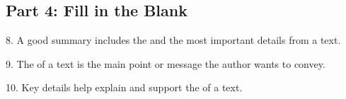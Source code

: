 \documentclass[12pt]{article}
\begin{document}
\subsection*{Part 4: Fill in the Blank}
\vspace{1cm}
8. A good summary includes the \underline{\hspace{4cm}} and the most important details from a text.

\vspace{3cm}

9. The \underline{\hspace{4cm}} of a text is the main point or message the author wants to convey.

\vspace{3cm}

10. Key details help explain and support the \underline{\hspace{4cm}} of a text.

\vspace{3cm}
\newpage





\end{document}
